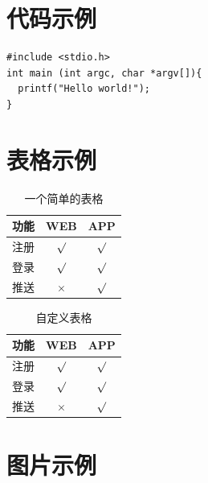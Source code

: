 \documentclass[a4paper,11pt,UTF8]{ctexart}
\begin{document}
\begin{appendix}

\section{代码示例}

\begin{lstlisting}[caption={一段C代码},captionpos=b]
#include <stdio.h>
int main (int argc, char *argv[]){
  printf("Hello world!");
}
\end{lstlisting}

\section{表格示例}
\begin{table}[!h!tbp]
\caption{一个简单的表格}\label{tab1}
  \centering
  \begin{tabular}{|l|c|c|}
	\hline
	功能          &WEB         &APP         \\ \hline
	注册          &$\surd$     &$\surd$     \\ \hline
	登录          &$\surd$     &$\surd$     \\ \hline
	推送          &$\times$    &$\surd$     \\ \hline
\end{tabular}
\end{table}

\begin{table}[!h!tbp]
\caption{自定义表格}\label{tab2}
  \centering
\begin{tabular*}{0.75\textwidth}{@{\extracolsep{\fill}}lcc}
    \toprule
    功能          &WEB         &APP         \\
    \midrule
    注册          &$\surd$     &$\surd$     \\
    登录          &$\surd$     &$\surd$     \\
    推送          &$\times$    &$\surd$     \\
    \bottomrule
\end{tabular*}
\end{table}


\section{图片示例}


\end{appendix}
\end{document}
